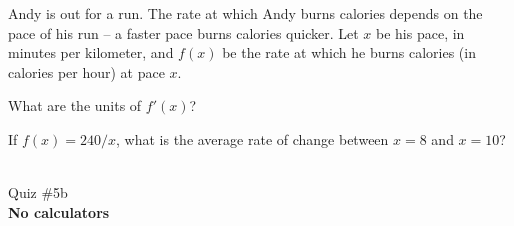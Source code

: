 \documentclass[12pt]{article}
\newcommand{\version}{}
\newcommand{\xzero}{}
\newcommand{\xone}{}
\newcommand{\xtwo}{}
\newcommand{\xthree}{}
\newcommand{\xfour}{}
\newcommand{\xfive}{}
\newcommand{\ExamName}{Quiz \#5\version}
\begin{document}
\begin{enumerate}
  \setcounter{problemnumber}{0}
  \Problem
  Andy is out for a run.  The rate at which Andy burns calories
  depends on the pace of his run -- a faster pace burns calories
  quicker.  Let $x$ be his pace, in minutes per kilometer, and $f(x)$ be the
  rate at which he burns calories (in calories per hour) at pace $x$.  
  \begin{enumerate}
    \Part What are the units of $f'(x)$?
    \hfill
    \vfill

    \Part If $f(x) = 240/x$, what is the average rate of change
    between $x=8$ and $x=10$?
    \hfill
    \vfill
  \end{enumerate}

\end{enumerate}
\newpage
\renewcommand{\version}{b}
\renewcommand{\xzero}{0.0}
\renewcommand{\xone}{1.4}
\renewcommand{\xtwo}{3.6}
\renewcommand{\xthree}{5.0}
\renewcommand{\xfour}{6.1}
\renewcommand{\xfive}{7.5}
\setcounter{problemnumber}{0}
% 
\begin{minipage}{0.25\linewidth}
  \CourseName\ \Quarter \\
  \ExamName \\[1em]
  \textbf{No calculators}\\[2em]
\end{minipage}
\hfill
\begin{minipage}[t]{0.4\linewidth}
\end{minipage}
\hfill
\begin{minipage}{0.25\linewidth}
  \vspace*{-3.25em}
  \ \hfill
\end{minipage}
\vspace*{-0.45in}
\end{document}
